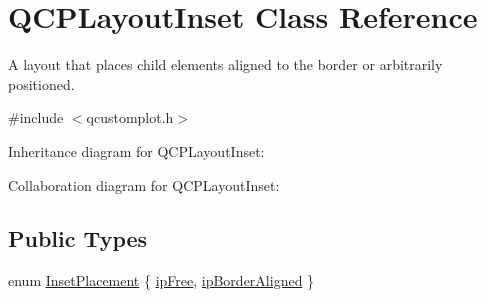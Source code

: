 \hypertarget{class_q_c_p_layout_inset}{}\section{Q\+C\+P\+Layout\+Inset Class Reference}
\label{class_q_c_p_layout_inset}


A layout that places child elements aligned to the border or arbitrarily positioned.  




{\ttfamily \#include $<$qcustomplot.\+h$>$}



Inheritance diagram for Q\+C\+P\+Layout\+Inset\+:


Collaboration diagram for Q\+C\+P\+Layout\+Inset\+:
\subsection*{Public Types}
\begin{DoxyCompactItemize}
\item 
enum \hyperlink{class_q_c_p_layout_inset_a8b9e17d9a2768293d2a7d72f5e298192}{Inset\+Placement} \{ \hyperlink{class_q_c_p_layout_inset_a8b9e17d9a2768293d2a7d72f5e298192aa4802986ea2cea457f932b115acba59e}{ip\+Free}, 
\hyperlink{class_q_c_p_layout_inset_a8b9e17d9a2768293d2a7d72f5e298192aa81e7df4a785ddee2229a8f47c46e817}{ip\+Border\+Aligned}
 \}
\end{DoxyCompactItemize}
